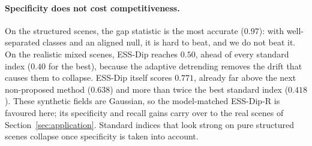\paragraph{Specificity does not cost competitiveness.}
On the structured scenes, the gap statistic is the most accurate
($0.97$): with well-separated classes and an aligned null, it is hard to beat,
and we do not beat it.  On the realistic mixed
scenes, ESS-Dip reaches $0.50$, ahead of every standard index ($0.40$ for the
best), because the adaptive detrending removes the drift that causes them to collapse.
ESS-Dip itself scores $0.771$, already far above the next non-proposed method
($0.638$) and more than twice the best standard index ($0.418$). These synthetic
fields are Gaussian, so the model-matched ESS-Dip-R is favoured here; its
specificity and recall gains carry over to the real scenes of
Section~\ref{sec:application}. Standard indices that look strong on pure
structured scenes collapse once specificity is taken into account.

